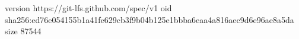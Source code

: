 version https://git-lfs.github.com/spec/v1
oid sha256:ed76e054155b1a41fe629cb3f9b04b125e1bbba6eaa4a816aec9d6e96ae8a5da
size 87544
